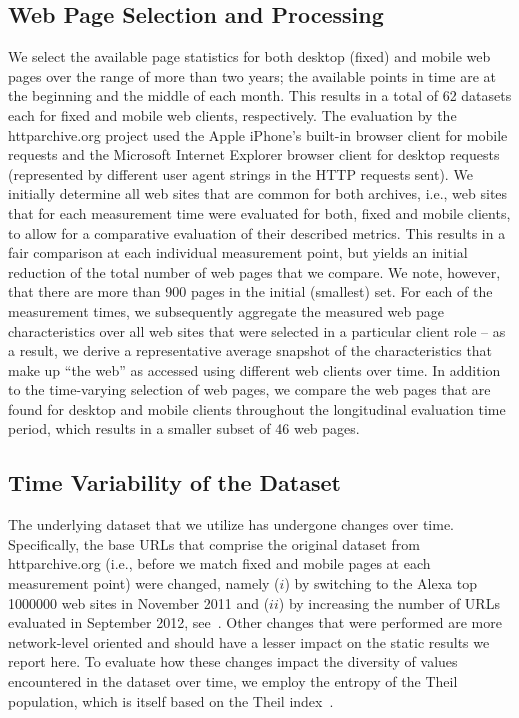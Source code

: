 \subsection*{Web Page Selection and Processing}
We select the available page statistics for both desktop (fixed) and mobile web pages over the range of more than two years; the available points in time are at the beginning and the middle of each month.
This results in a total of 62 datasets each for fixed and mobile web clients, respectively.
The evaluation by the httparchive.org project used the Apple iPhone's built-in browser client for mobile requests and the Microsoft Internet Explorer browser client for desktop requests (represented by different user agent strings in the HTTP requests sent).
We initially determine all web sites that are common for both archives, i.e., web sites that for each measurement time were evaluated for both, fixed and mobile clients, to allow for a comparative evaluation of their described metrics.
This results in a fair comparison at each individual measurement point, but yields an initial reduction of the total number of web pages that we compare. We note, however, that there are more than 900 pages in the initial (smallest) set. 
For each of the measurement times, we subsequently aggregate the measured web page characteristics over all web sites that were selected in a particular client role -- as a result, we derive a representative average snapshot of the characteristics that make up ``the web'' as accessed using different web clients over time.
In addition to the time-varying selection of web pages, we compare the web pages that are found for desktop and mobile clients throughout the longitudinal evaluation time period, which results in a smaller subset of 46 web pages.


\subsection*{Time Variability of the Dataset}
The underlying dataset that we utilize has undergone changes over time. 
Specifically, the base URLs that comprise the original dataset from httparchive.org (i.e., before we match fixed and mobile pages at each measurement point) were changed, namely ($i$) by switching to the Alexa top 1000000 web sites in November 2011 and ($ii$) by increasing the number of URLs evaluated in September 2012, see~\cite{ht13}. Other changes that were performed are more network-level oriented and should have a lesser impact on the static results we report here.
To evaluate how these changes impact the diversity of values encountered in the dataset over time, we employ the entropy of the Theil population, which is itself based on the Theil index~\cite{Th72}.

